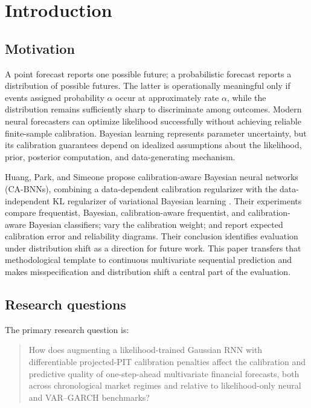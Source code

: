 \documentclass[11pt]{article}
\begin{document}
\newpage
\tableofcontents
\clearpage
\hypersetup{pageanchor=true}

\section{Introduction}

\subsection{Motivation}

A point forecast reports one possible future; a probabilistic forecast reports a
distribution of possible futures. The latter is operationally meaningful only if
events assigned probability $\alpha$ occur at approximately rate $\alpha$, while
the distribution remains sufficiently sharp to discriminate among outcomes.
Modern neural forecasters can optimize likelihood successfully without achieving
reliable finite-sample calibration. Bayesian learning represents parameter
uncertainty, but its calibration guarantees depend on idealized assumptions about
the likelihood, prior, posterior computation, and data-generating mechanism.

Huang, Park, and Simeone propose calibration-aware Bayesian neural networks
(CA-BNNs), combining a data-dependent calibration regularizer with the
data-independent KL regularizer of variational Bayesian learning
\cite{huang2024cabl}. Their experiments compare frequentist, Bayesian,
calibration-aware frequentist, and calibration-aware Bayesian classifiers; vary
the calibration weight; and report expected calibration error and reliability
diagrams. Their conclusion identifies evaluation under distribution shift as a
direction for future work. This paper transfers that methodological template to
continuous multivariate sequential prediction and makes misspecification and
distribution shift a central part of the evaluation.

\subsection{Research questions}

The primary research question is:

\begin{quote}
How does augmenting a likelihood-trained Gaussian RNN with differentiable
projected-PIT calibration penalties affect the calibration and predictive
quality of one-step-ahead multivariate financial forecasts, both across
chronological market regimes and relative to likelihood-only neural and
VAR--GARCH benchmarks?
\end{quote}
\end{document}
